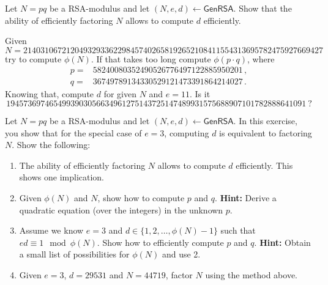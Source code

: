 \documentclass[a4paper,10pt,landscape,twocolumn]{scrartcl}
\begin{document}
\begin{exercise}[RSA]
\begin{subex}
Let $N=pq$ be a RSA-modulus and let
  $(N,e,d) \leftarrow \mathsf{GenRSA}$. 
Show that the ability of efficiently factoring $N$ allows to compute $d$
  efficiently.
  
  Given 
  \begin{equation*}
  N=2140310672120493293362298457402658192652108411554313695782475927669427
  \end{equation*}
  try to compute $\phi(N)$. If that takes too long compute $\phi(p\cdot q)$, where 
  \begin{align*}
  p=&58240080352490526776497122885950201 \, ,\\
  q=&36749789134330529121473391864214027 \, .
  \end{align*}
  Knowing that, compute $d$ for given $N$ and $e=11$. Is it 
  \begin{equation*}
  1945736974654993903056634961275143725147489931575688907101782888641091 \  ?
  \end{equation*}
\end{subex}

\begin{subex}
Let $N=pq$ be a RSA-modulus and let
 $(N,e,d) \leftarrow \mathsf{GenRSA}$. In this exercise, you show
 that for the special case of $e=3$, computing $d$ is equivalent to
 factoring $N$. Show the following:
 \begin{enumerate}
 \item The ability of efficiently factoring $N$ allows to compute $d$
 efficiently. This shows one implication.
 \item Given $\phi(N)$ and $N$, show how to compute $p$ and $q$. 
\textbf{Hint:} Derive a quadratic equation (over the integers) in the
   unknown $p$.
   \item Assume we know $e=3$ and $d \in \{1,2,\ldots,\phi(N)-1\}$ such
   that $ed \equiv 1 \mod \phi(N)$. Show how to efficiently compute
   $p$ and $q$. \textbf{Hint:} Obtain a small list of possibilities for
   $\phi(N)$ and use 2.
   \item Given $e=3$, $d=29531$ and $N=44719$, factor $N$ using the
 method above.
 \end{enumerate}
\end{subex}
\end{exercise}
\end{document}
